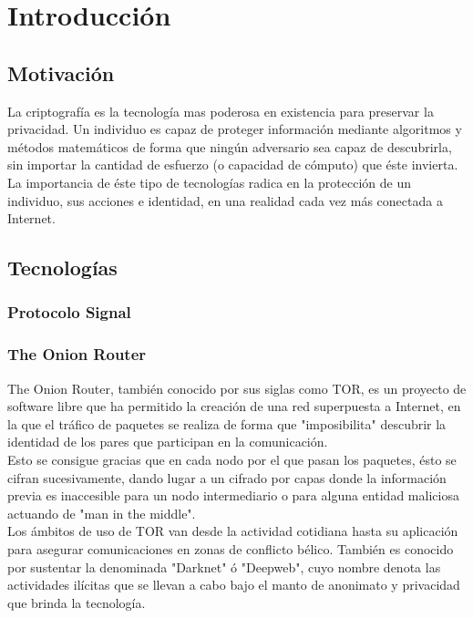 \chapter{Introducción}

\section {Motivación}

La criptografía es la tecnología mas poderosa en existencia para preservar la privacidad. Un individuo es capaz de proteger información mediante algoritmos y métodos matemáticos de forma que ningún adversario sea capaz de descubrirla, sin importar la cantidad de esfuerzo (o capacidad de cómputo) que éste invierta. \\

La importancia de éste tipo de tecnologías radica en la protección de un individuo, sus acciones e identidad, en una realidad cada vez más conectada a Internet. \\


\section {Tecnologías}
\subsection {Protocolo Signal}
\subsection {The Onion Router}

The Onion Router, también conocido por sus siglas como TOR, es un proyecto de software libre que ha permitido la creación de una red superpuesta a Internet, en la que el tráfico de paquetes se realiza de forma que "imposibilita" descubrir la identidad de los pares que participan en la comunicación. \\

Esto se consigue gracias que en cada nodo por el que pasan los paquetes, ésto se cifran sucesivamente, dando lugar a un cifrado por capas donde la información previa es inaccesible para un nodo intermediario o para alguna entidad maliciosa actuando de "man in the middle". \\

Los ámbitos de uso de TOR van desde la actividad cotidiana hasta su aplicación para asegurar comunicaciones en zonas de conflicto bélico. También es conocido por sustentar la denominada "Darknet" ó "Deepweb", cuyo nombre denota las actividades ilícitas que se llevan a cabo bajo el manto de anonimato y privacidad que brinda la tecnología. \\

